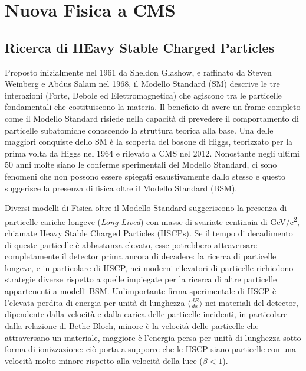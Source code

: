\chapter{Nuova Fisica a CMS}
\label{cap:TerzoCapitolo}

\section{Ricerca di HEavy Stable Charged Particles}
\label{sec:NewPhysics}

Proposto inizialmente nel 1961 da Sheldon Glashow, e raffinato da Steven Weinberg e Abdus Salam nel 1968, il Modello Standard (SM) descrive le tre interazioni (Forte, Debole ed Elettromagnetica) che agiscono tra le particelle fondamentali che costituiscono la materia. Il beneficio di avere un frame completo come il Modello Standard risiede nella capacità di prevedere il comportamento di particelle subatomiche conoscendo la struttura teorica alla base. Una delle maggiori conquiste dello SM è la scoperta del bosone di Higgs, teorizzato per la prima volta da Higgs nel 1964 e rilevato a CMS nel 2012. \newline
Nonostante negli ultimi 50 anni molte siano le conferme sperimentali del Modello Standard, ci sono fenomeni che non possono essere spiegati esaustivamente dallo stesso e questo suggerisce la presenza di fisica oltre il Modello Standard (BSM).

Diversi modelli di Fisica oltre il Modello Standard suggeriscono la presenza di particelle cariche longeve (\textit{Long-Lived}) con masse di svariate centinaia di \si{GeV/c^2}, chiamate Heavy Stable Charged Particles (HSCPs). Se il tempo di decadimento di queste particelle è abbastanza elevato, esse potrebbero attraversare completamente il detector prima ancora di decadere: la ricerca di particelle longeve, e in particolare di HSCP, nei moderni rilevatori di particelle richiedono strategie diverse rispetto a quelle impiegate per la ricerca di altre particelle appartenenti a modelli BSM. \newline 
Un'importante firma sperimentale di HSCP è l'elevata perdita di energia per unità di lunghezza $\langle \frac{dE}{dx}\rangle$ nei materiali del detector, dipendente dalla velocità e dalla carica delle particelle incidenti, in particolare dalla relazione di Bethe-Bloch, minore è la velocità delle particelle che attraversano un materiale, maggiore è l'energia persa per unità di lunghezza sotto forma di ionizzazione: ciò porta a supporre che le HSCP siano particelle con una velocità molto minore rispetto alla velocità della luce ($\beta < 1$). 




